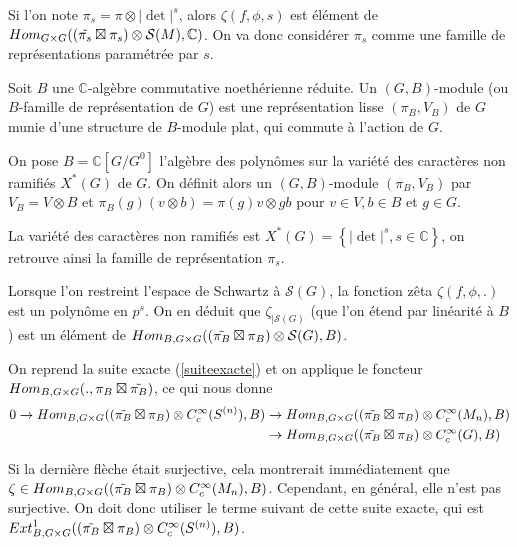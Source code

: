 Si l'on note $\pi_s = \pi \otimes |\det|^s$, alors $\zeta(f, \phi, s)$ est élément de $\operatorname{\mathnormal{Hom}}_{G \times G}((\tilde{\pi_s} \boxtimes \pi_s) \otimes \mathcal{S}(M), \mathbb{C})$. On va donc considérer $\pi_s$ comme une famille de représentations paramétrée par $s$.

\begin{definition}
Soit $B$ une $\mathbb{C}$-algèbre commutative noethérienne réduite. Un $(G, B)$-module (ou $B$-famille de représentation de $G$) est une représentation lisse $(\pi_B, V_B)$ de $G$ munie d'une structure de $B$-module plat, qui commute à l'action de $G$.
\end{definition}

On pose $B=\mathbb{C}[G/G^0]$ l'algèbre des polynômes sur la variété des caractères non ramifiés $X^*(G)$ de $G$. On définit alors un $(G,B)$-module $(\pi_B, V_B)$ par $V_B = V \otimes B$ et $\pi_B(g)(v \otimes b) = \pi(g)v \otimes gb$ pour $v \in V, b \in B$ et $g \in G$.

La variété des caractères non ramifiés est $X^*(G) = \left\lbrace |\det|^s, s \in \mathbb{C} \right\rbrace$, on retrouve ainsi la famille de représentation $\pi_s$.

Lorsque l'on restreint l'espace de Schwartz à $\mathcal{S}(G)$, la fonction zêta $\zeta(f, \phi, .)$ est un polynôme en $p^s$. On en déduit que $\zeta_{|\mathcal{S}(G)}$ (que l'on étend par linéarité à $B$) est un élément de $\operatorname{\mathnormal{Hom}}_{B, G \times G}((\tilde{\pi_B} \boxtimes \pi_B) \otimes \mathcal{S}(G), B)$.

On reprend la suite exacte (\ref{suiteexacte}) et on applique le foncteur $\operatorname{\mathnormal{Hom}}_{B, G \times G} (., \pi_B \boxtimes \tilde{\pi_B})$, ce qui nous donne
\begin{equation}
\begin{split}
0 \rightarrow \operatorname{\mathnormal{Hom}}_{B, G \times G}((\tilde{\pi_B} \boxtimes \pi_B) \otimes C^\infty_c(S^{(n)}), B) &\rightarrow \operatorname{\mathnormal{Hom}}_{B, G \times G}((\tilde{\pi_B} \boxtimes \pi_B) \otimes C^\infty_c(M_n), B) \\
&\rightarrow \operatorname{\mathnormal{Hom}}_{B, G \times G}((\tilde{\pi_B} \boxtimes \pi_B) \otimes C^\infty_c(G), B)
\end{split}
\end{equation}

Si la dernière flèche était surjective, cela montrerait immédiatement que $\zeta \in \operatorname{\mathnormal{Hom}}_{B, G \times G}((\tilde{\pi_B} \boxtimes \pi_B) \otimes C^\infty_c(M_n), B)$. Cependant, en général, elle n'est pas surjective. On doit donc utiliser le terme suivant de cette suite exacte, qui est $\operatorname{\mathnormal{Ext}}^1_{B, G \times G}((\tilde{\pi_B} \boxtimes \pi_B) \otimes C^\infty_c(S^{(n)}), B)$.


